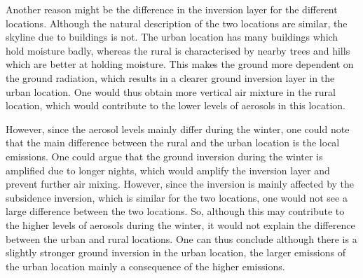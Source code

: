 Another reason might be the difference in the inversion layer for the different locations. Although the natural description of the two locations are similar, the skyline due to buildings is not. The urban location has many buildings which hold moisture badly, whereas the rural is characterised by nearby trees and hills which are better at holding moisture. This makes the ground more dependent on the ground radiation, which results in a clearer ground inversion layer in the urban location. One would thus obtain more vertical air mixture in the rural location, which would contribute to the lower levels of aerosols in this location. 

However, since the aerosol levels mainly differ during the winter, one could note that the main difference between the rural and the urban location is the local emissions. One could argue that the ground inversion during the winter is amplified due to longer nights, which would amplify the inversion layer and prevent further air mixing. However, since the inversion is mainly affected by the subsidence inversion, which is similar for the two locations, one would not see a large difference between the two locations. So, although this may contribute to the higher levels of aerosols during the winter, it would not explain the difference between the urban and rural locations. One can thus conclude although there is a slightly stronger ground inversion in the urban location, the larger emissions of the urban location mainly a consequence of the higher emissions.
